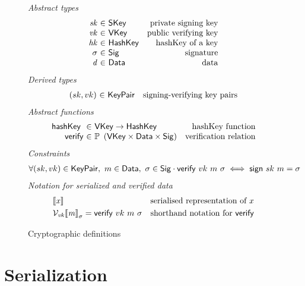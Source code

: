 \documentclass[11pt,a4paper]{article}
\newcommand{\VKey}{\type{VKey}}
\newcommand{\SKey}{\type{SKey}}
\newcommand{\HashKey}{\type{HashKey}}
\newcommand{\KeyPair}{\type{KeyPair}}
\newcommand{\Sig}{\type{Sig}}
\newcommand{\Data}{\type{Data}}
\newcommand{\verify}[3]{\fun{verify} ~ #1 ~ #2 ~ #3}
\newcommand{\sign}[2]{\fun{sign} ~ #1 ~ #2}
\newcommand{\serialised}[1]{\llbracket \var{#1} \rrbracket}
\newcommand{\hashKey}[1]{\fun{hashKey}~ \var{#1}}
\theoremstyle{definition}
\theoremstyle{definition}
\begin{document}
\begin{figure}
  \emph{Abstract types}
  \begin{equation*}
    \begin{array}{r@{~\in~}lr}
      \var{sk} & \SKey & \text{private signing key}\\
      \var{vk} & \VKey & \text{public verifying key}\\
      \var{hk} & \HashKey & \text{hashKey of a key}\\
      \sigma & \Sig  & \text{signature}\\
      \var{d} & \Data  & \text{data}\\
    \end{array}
  \end{equation*}
  \emph{Derived types}
  \begin{equation*}
    \begin{array}{r@{~\in~}lr}
      (sk, vk) & \KeyPair & \text{signing-verifying key pairs}
    \end{array}
  \end{equation*}
  \emph{Abstract functions}
  \begin{equation*}
    \begin{array}{r@{~\in~}lr}
      \hashKey{} & \VKey \to \HashKey
      & \text{hashKey function} \\
      \fun{verify} & \powerset{\left(\VKey \times \Data \times \Sig\right)}
      & \text{verification relation}\\
    \end{array}
  \end{equation*}
  \emph{Constraints}
  \begin{align*}
    & \forall (sk, vk) \in \KeyPair,~ m \in \Data,~ \sigma \in \Sig \cdot
      \verify{vk}{m}{\sigma} \iff \sign{sk}{m} = \sigma
  \end{align*}
  \emph{Notation for serialized and verified data}
  \begin{align*}
    & \serialised{x} & \text{serialised representation of } x\\
    & \mathcal{V}_{\var{vk}}{\serialised{m}}_{\sigma} = \verify{vk}{m}{\sigma}
      & \text{shorthand notation for } \fun{verify}
  \end{align*}
  \caption{Cryptographic definitions}
  \label{fig:crypto-defs}
\end{figure}

\section{Serialization}
\label{sec:serialization}
\end{document}
